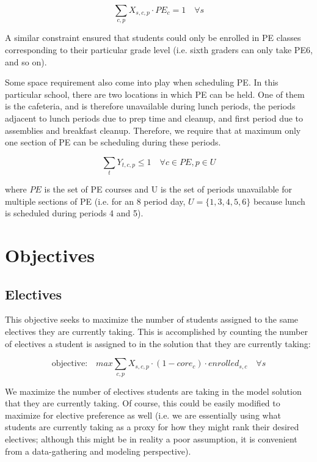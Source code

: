 \documentclass[12pt]{article}
\begin{document}
\begin{equation} \label{eq:one-sink}
	\displaystyle\sum_{c,p} X_{s,c,p} \cdot PE_{c} = 1 \quad \forall s
\end{equation}

A similar constraint ensured that students could only be enrolled in PE classes corresponding to their particular grade level (i.e. sixth graders can only take PE6, and so on).

Some space requirement also come into play when scheduling PE. In this particular school, there are two locations in which PE can be held. One of them is the cafeteria, and is therefore unavailable during lunch periods, the periods adjacent to lunch periods due to prep time and cleanup, and first period due to assemblies and breakfast cleanup. Therefore, we require that at maximum only one section of PE can be scheduling during these periods.

\begin{equation} \label{eq:one-sink}
	\displaystyle\sum_{t} Y_{t,c,p} \leq 1 \quad \forall c \in PE, p \in U
\end{equation}

where $PE$ is the set of PE courses and U is the set of periods unavailable for multiple sections of PE (i.e. for an 8 period day, $U=\{1,3,4,5,6\}$ because lunch is scheduled during periods 4 and 5).


\section{Objectives}

\subsection{Electives}

This objective seeks to maximize the number of students assigned to the same electives they are currently taking. This is accomplished by counting the number of electives a student is assigned to in the solution that they are currently taking:

\begin{equation} \label{eq:link-num-electives}
	\text{objective:}\quad max \displaystyle\sum_{c,p} X_{s,c,p} \cdot (1-core_{c}) \cdot enrolled_{s,c} \quad \forall s
\end{equation}

We maximize the number of electives students are taking in the model solution that they are currently taking. Of course, this could be easily modified to maximize for elective preference as well (i.e. we are essentially using what students are currently taking as a proxy for how they might rank their desired electives; although this might be in reality a poor assumption, it is convenient from a data-gathering and modeling perspective).
\end{document}
